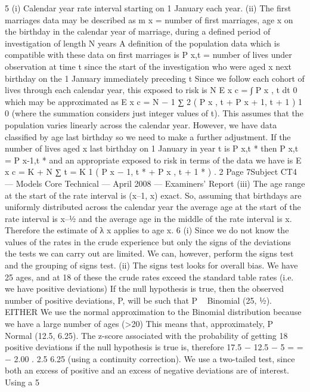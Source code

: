 \documentclass[a4paper,12pt]{article}
\begin{document}
\begin{enumerate}
5
(i) Calendar year rate interval starting on 1 January each
year.
(ii) The first marriages data may be described as
m x = number of first marriages, age x on the birthday in the
calendar year of marriage, during a defined period of investigation of
length N years
A definition of the population data which is compatible with these data on first
marriages is
P x,t = number of lives under observation at time t since the start of the
investigation who were aged x next birthday on the 1 January
immediately preceding t
Since we follow each cohort of lives through each calendar year, this exposed
to risk is
N
E x c
=
∫ P x , t dt
0
which may be approximated as
E x c =
N − 1
∑ 2 ( P x , t + P x + 1, t + 1 )
1
0
(where the summation considers just integer values of t).
This assumes that the population varies linearly across the
calendar year.
However, we have data classified by age last birthday
so we need to make a further adjustment.
If the number of lives aged x last birthday on 1 January
in year t is P x,t * then
P x,t = P x-1,t *
and an appropriate exposed to risk in terms of the data we
have is
E x c =
K + N
∑
t = K
1
( P x − 1, t * + P x , t + 1 * ) .
2
Page 7Subject CT4 — Models Core Technical — April 2008 — Examiners’ Report
(iii)
The age range at the start of the rate interval is (x–1, x)
exact.
So, assuming that birthdays are uniformly distributed
across the calendar year the average age at the start of the rate interval is
x–1⁄2 and the average age in the middle of the rate interval
is x.
Therefore the estimate of λ x applies to age x.
6
(i)
Since we do not know the values of the rates in the
crude experience but only the signs of the deviations the
tests we can carry out are limited.
We can, however, perform the signs test and the grouping
of signs test.
(ii)
The signs test looks for overall bias.
We have 25 ages, and at 18 of these the crude rates
exceed the standard table rates (i.e. we have positive deviations)
If the null hypothesis is true, then the observed number of
positive deviations, P, will be such that P ~ Binomial (25, 1⁄2).
EITHER
We use the normal approximation to the Binomial
distribution because we have a large number of ages (>20)
This means that, approximately, P ~ Normal (12.5, 6.25).
The z-score associated with the probability of getting 18
positive deviations if the null hypothesis is true is, therefore
17.5 − 12.5 − 5
=
= − 2.00 .
2.5
6.25
(using a continuity correction).
We use a two-tailed test, since both an excess of
positive and an excess of negative deviations are of interest.
Using a 5 %

\end{enumerate}
\end{document}
